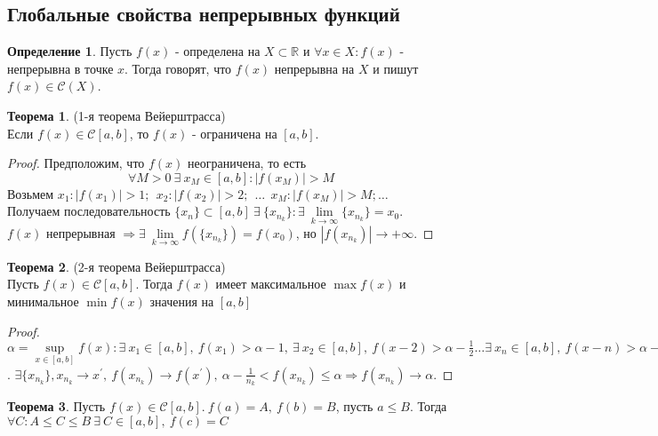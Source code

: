 \documentclass[a4paper, 12pt]{article}
\newcommand{\R}{\mathbb{R}}
\theoremstyle{definition}
\newtheorem*{definition}{Определение}
\newtheorem*{theorem}{Теорема}
\begin{document}
    \subsection{Глобальные свойства непрерывных функций}
        \begin{definition}
            Пусть $f(x)$ - определена на $X\subset \R$ и $\forall x\in X: f(x)$ - непрерывна в точке $x$. Тогда говорят, что $f(x)$ непрерывна на $X$ и пишут $f(x)\in \mathcal{C}(X)$.
        \end{definition} 
        \begin{theorem} (1-я теорема Вейерштрасса)\\
            Если $f(x)\in \mathcal{C}[a,b]$, то $f(x)$ - ограничена на $[a,b]$.
        \end{theorem} 
        \begin{proof}
            Предположим, что $f(x)$ неограничена, то есть\\
            \[\forall M>0\ \exists\ x_M\in [a,b]: |f(x_M)|>M\]
            Возьмем $x_1: |f(x_1)|>1;\ \ x_2: |f(x_2)|>2;\ \  \dots\ \ x_M: |f(x_M)|>M;\dots$\\
            Получаем последовательность $\{x_n\}\subset [a,b]\ \exists\ \{x_{n_k}\}: \exists\ \lim\limits_{k\to \infty}\{x_{n_k}\}=x_0$.\\
            $f(x)$ непрерывная $\Rightarrow \exists\ \lim\limits_{k\to \infty}f(\{x_{n_k}\})=f(x_0)$, но $|f(x_{n_k})|\to +\infty$. 
        \end{proof} 
        \begin{theorem} (2-я теорема Вейерштрасса)\\
            Пусть $f(x)\in \mathcal{C}[a,b]$. Тогда $f(x)$ имеет максимальное $\max{f(x)}$ и минимальное $\min{f(x)}$ значения на $[a,b]$
        \end{theorem} 
        \begin{proof}
            $\alpha = \sup\limits_{x\in [a,b]} f(x): \exists\ x_1 \in [a,b],\ f(x_1)>\alpha-1,\ \exists\ x_2\in [a,b],\ f(x-2)>\alpha - \frac{1}{2}\dots \exists\ x_n\in [a,b],\ f(x-n)>\alpha - \frac{1}{n}, \dots$. $\exists \{x_{n_k}\}, x_{n_k}\to x^{\prime},\ f(x_{n_k})\to f(x^{\prime}),\ \alpha-\frac{1}{n_k}<f(x_{n_k})\leq \alpha \Rightarrow f(x_{n_k})\to \alpha$.
        \end{proof} 
        \begin{theorem}
            Пусть $f(x)\in \mathcal{C}[a,b].\ f(a)=A,\ f(b)=B$, пусть $a\leq B$. Тогда $\forall C: A\leq C\leq B\ \exists\ C\in [a,b],\ f(c)=C$
        \end{theorem} 
\end{document}
